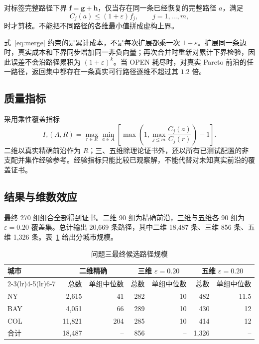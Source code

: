 \documentclass[UTF8,a4paper]{ctexart}
\newcommand{\eps}{\varepsilon}
\begin{document}
对标签完整路径下界 $\bm f=\bm g+\bm h$，仅当存在同一条已经恢复的完整路径 $a$，满足
\begin{equation}
C_j(a)\le(1+\eps)f_j,\qquad j=1,\ldots,m,
\end{equation}
时才剪枝。不能把不同路径的各维最小值拼成虚构上界。

式~\eqref{eq:merge} 约束的是累计成本，不是每次扩展都乘一次 $1+\eps$。扩展同一条边时，真实成本和下界同步增加同一非负向量；再次合并时重新对累计下界检验，因此误差不会沿路径累积为 $(1+\eps)^k$。当 OPEN 耗尽时，对真实 Pareto 前沿的任一路径，返回集中都存在一条真实可行路径逐维不超过其 $1.2$ 倍。

\subsection{质量指标}

采用乘性覆盖指标
\begin{equation}
I_\eps(A,R)=\max_{r\in R}\min_{a\in A}
\left[\max\left(1,\max_{j\le m}\frac{C_j(a)}{C_j(r)}\right)-1\right].
\end{equation}
二维以真实精确前沿作为 $R$；三、五维除理论证书外，还以所有已测试配置的非支配并集作经验参考。经验指标只能比较已观察解，不能代替对未知真实前沿的覆盖证书。

\subsection{结果与维数效应}

最终 270 组组合全部得到证书。二维 90 组为精确前沿，三维与五维各 90 组为 $\eps=0.20$ 覆盖集。总计输出 20,669 条路径，其中二维 18,487 条、三维 856 条、五维 1,326 条。表~\ref{tab:q3size} 给出分城市规模。

\begin{table}[H]
\centering
\caption{问题三最终候选路径规模}
\label{tab:q3size}
\begin{tabular}{lrrrrrr}
\toprule
\multirow{2}{*}{城市} & \multicolumn{2}{c}{二维精确} & \multicolumn{2}{c}{三维 $\eps=0.20$} & \multicolumn{2}{c}{五维 $\eps=0.20$}\\
\cmidrule(lr){2-3}\cmidrule(lr){4-5}\cmidrule(lr){6-7}
& 总数 & 单组中位数 & 总数 & 单组中位数 & 总数 & 单组中位数 \\
\midrule
NY  & 2,615  & 41  & 282 & 10 & 482 & 11.5 \\
BAY & 4,051  & 66  & 289 & 10 & 430 & 12 \\
COL & 11,821 & 204 & 285 & 10 & 414 & 12 \\
\midrule
合计 & 18,487 & -- & 856 & -- & 1,326 & -- \\
\bottomrule
\end{tabular}
\end{table}
\end{document}
